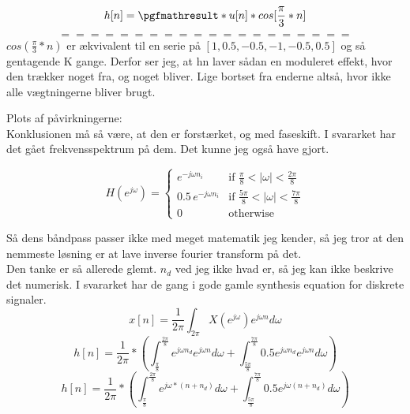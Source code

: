 \begin{Opgaver}
\begin{kapitel}
\begin{Opgave}
\begin{UnderOpgave}[\text{$H(z) = \filterZto{1, 0, 1.778, 0, 3.1605}{1, 0, 0.5625, 0, 0.3164}$}]
                 \edef\resultat{\pgfmathresult}
                \[h[n] = \resultat * u[n] * cos[\frac{\pi}{3} * n]\]
                \[====================\]
                $cos(\frac{\pi}{3} * n)$ er ækvivalent til en serie på $[1, 0.5, -0.5, -1, -0.5, 0.5]$ og så gentagende K gange.
                Derfor ser jeg, at hn laver sådan en moduleret effekt, hvor den trækker noget fra, og noget bliver. Lige bortset fra enderne altså,
                hvor ikke alle vægtningerne bliver brugt. \\
            \end{UnderOpgave}
            Plots af påvirkningerne: \\
            \clearpage
            Konklusionen må så være, at den er forstærket, og med faseskift. 
            I svararket har det gået frekvensspektrum på dem. Det kunne jeg også have gjort. 
        \end{Opgave}
        \begin{Opgave}
            \[H(e^{j\omega}) =
                \begin{cases}
                    e^{-j\omega n_{i}} & \text{if } \frac{\pi}{8} < |\omega| < \frac{2\pi}{8} \\
                    0.5\,e^{-j\omega n_{i}} & \text{if } \frac{5\pi}{8} < |\omega| < \frac{7\pi}{8} \\
                    0 & \text{otherwise}
                \end{cases} 
            \]
            \begin{UnderOpgave}
                Så dens båndpass passer ikke med meget matematik jeg kender, så jeg tror at den nemmeste løsning er at lave inverse fourier transform på det. \\
                Den tanke er så allerede glemt. $n_d$ ved jeg ikke hvad er, så jeg kan ikke beskrive det numerisk. 
                I svararket har de gang i gode gamle synthesis equation for diskrete signaler. 
                \[x[n] = \frac{1}{2\pi} \int_{2\pi} X(e^{j\omega})e^{j\omega n}d\omega\]
                \[h[n] = \frac{1}{2\pi} * (\int_{\frac{\pi}{8}}^{\frac{2\pi}{8}}e^{j\omega n_d}e^{j\omega n}d\omega + \int_{\frac{5\pi}{8}}^{\frac{7\pi}{8}}0.5e^{j\omega n_d}e^{j\omega n}d\omega)\]
                \[h[n] = \frac{1}{2\pi} * (\int_{\frac{\pi}{8}}^{\frac{2\pi}{8}}e^{j\omega*(n + n_d)}d\omega + \int_{\frac{5\pi}{8}}^{\frac{7\pi}{8}}0.5e^{j\omega(n + n_d)}d\omega)\]

\end{UnderOpgave}
\end{Opgave}
\end{kapitel}
\end{Opgaver}
